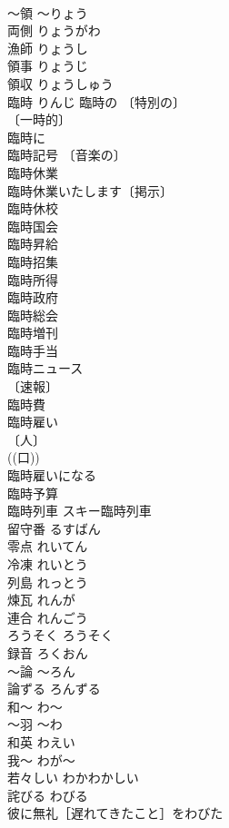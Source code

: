 \documentclass[8pt]{extreport}
\begin{document}
\begin{CJK}{UTF8}{min}
\\	～領	～りょう	
\\	両側	りょうがわ	
\\	漁師	りょうし	
\\	領事	りょうじ	
\\	領収	りょうしゅう	
\\	臨時	りんじ	臨時の 〔特別の〕
\\	〔一時的〕
\\	臨時に 
\\	臨時記号 〔音楽の〕
\\	臨時休業 
\\	臨時休業いたします〔掲示〕 
\\	臨時休校 
\\	臨時国会 
\\	臨時昇給 
\\	臨時招集 
\\	臨時所得 
\\	臨時政府 
\\	臨時総会 
\\	臨時増刊 
\\	臨時手当 
\\	臨時ニュース 
\\	〔速報〕
\\	臨時費 
\\	臨時雇い 
\\	〔人〕
\\	((口)) 
\\	臨時雇いになる 
\\	臨時予算 
\\	臨時列車 スキー臨時列車 
\\	留守番	るすばん	
\\	零点	れいてん	
\\	冷凍	れいとう	
\\	列島	れっとう	
\\	煉瓦	れんが	
\\	連合	れんごう	
\\	ろうそく	ろうそく	
\\	録音	ろくおん	
\\	～論	～ろん	
\\	論ずる	ろんずる	
\\	和～	わ～	
\\	～羽	～わ	
\\	和英	わえい	
\\	我～	わが～	
\\	若々しい	わかわかしい	
\\	詫びる	わびる	
\\	彼に無礼［遅れてきたこと］をわびた 

\end{CJK}
\end{document}
